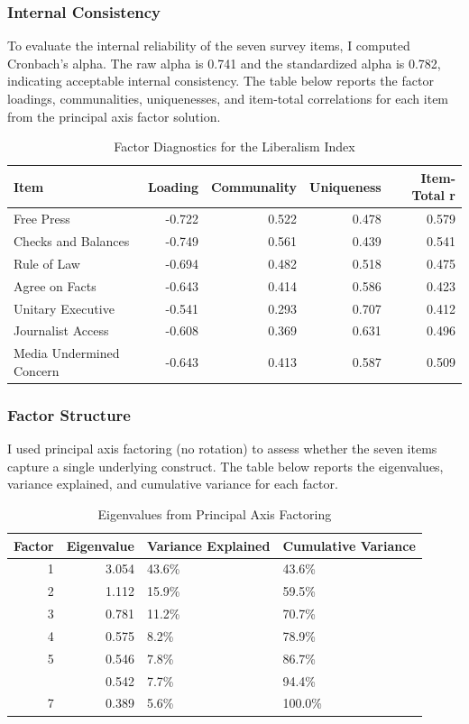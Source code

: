 \documentclass[
  10pt,
  letterpaper,
  DIV=11,
  numbers=noendperiod]{scrartcl}
\begin{document}
\subsubsection{Internal Consistency}\label{internal-consistency}

To evaluate the internal reliability of the seven survey items, I
computed Cronbach's alpha. The raw alpha is 0.741 and the standardized
alpha is 0.782, indicating acceptable internal consistency. The table
below reports the factor loadings, communalities, uniquenesses, and
item-total correlations for each item from the principal axis factor
solution.

\begin{table}[H]
\centering
\caption{\label{tab:unnamed-chunk-2}Factor Diagnostics for the Liberalism Index}
\centering
\begin{tabular}[t]{lrrrr}
\toprule
Item & Loading & Communality & Uniqueness & Item-Total r\\
\midrule
Free Press & -0.722 & 0.522 & 0.478 & 0.579\\
Checks and Balances & -0.749 & 0.561 & 0.439 & 0.541\\
Rule of Law & -0.694 & 0.482 & 0.518 & 0.475\\
Agree on Facts & -0.643 & 0.414 & 0.586 & 0.423\\
Unitary Executive & -0.541 & 0.293 & 0.707 & 0.412\\
\addlinespace
Journalist Access & -0.608 & 0.369 & 0.631 & 0.496\\
Media Undermined Concern & -0.643 & 0.413 & 0.587 & 0.509\\
\bottomrule
\end{tabular}
\end{table}

\subsubsection{Factor Structure}\label{factor-structure}

I used principal axis factoring (no rotation) to assess whether the
seven items capture a single underlying construct. The table below
reports the eigenvalues, variance explained, and cumulative variance for
each factor.

\begin{table}[H]
\centering
\caption{\label{tab:unnamed-chunk-3}Eigenvalues from Principal Axis Factoring}
\centering
\begin{tabular}[t]{rrll}
\toprule
Factor & Eigenvalue & Variance Explained & Cumulative Variance\\
\midrule
1 & 3.054 & 43.6\% & 43.6\%\\
2 & 1.112 & 15.9\% & 59.5\%\\
3 & 0.781 & 11.2\% & 70.7\%\\
4 & 0.575 & 8.2\% & 78.9\%\\
5 & 0.546 & 7.8\% & 86.7\%\\
\addlinespace
6 & 0.542 & 7.7\% & 94.4\%\\
7 & 0.389 & 5.6\% & 100.0\%\\
\bottomrule
\end{tabular}
\end{table}
\end{document}
